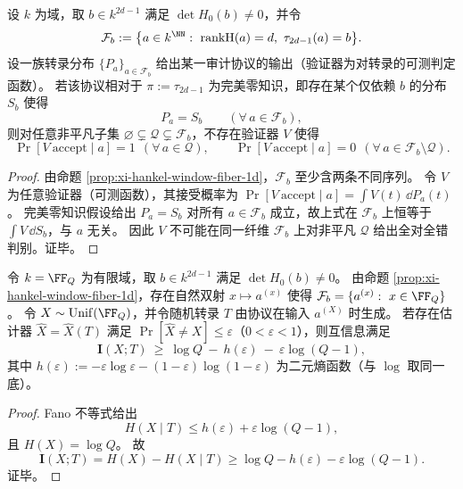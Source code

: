 \begin{theorem}\label{thm:xi-hankel-window-2dminus1-perfect-zk-indistinguishability}
设 \(k\) 为域，取 \(b\in k^{2d-1}\) 满足 \(\det H_0(b)\neq 0\)，并令
\[
\mathcal F_b:=\bigl\{a\in k^{\NN}:\ \mathrm{rankH}(a)=d,\ \tau_{2d-1}(a)=b\bigr\}.
\]
设一族转录分布 \(\{P_a\}_{a\in\mathcal F_b}\) 给出某一审计协议的输出（验证器为对转录的可测判定函数）。
若该协议相对于 \(\pi:=\tau_{2d-1}\) 为完美零知识，即存在某个仅依赖 \(b\) 的分布 \(S_b\) 使得
\[
P_a=S_b\qquad(\forall\,a\in\mathcal F_b),
\]
则对任意非平凡子集 \(\varnothing\subsetneq \mathcal Q\subsetneq \mathcal F_b\)，不存在验证器 \(V\) 使得
\[
\Pr[V\ \mathrm{accept}\mid a]=1\ \ (\forall\,a\in\mathcal Q),
\qquad
\Pr[V\ \mathrm{accept}\mid a]=0\ \ (\forall\,a\in\mathcal F_b\setminus\mathcal Q).
\]
\end{theorem}
\begin{proof}
由命题 \ref{prop:xi-hankel-window-fiber-1d}，\(\mathcal F_b\) 至少含两条不同序列。
令 \(V\) 为任意验证器（可测函数），其接受概率为
\(
\Pr[V\ \mathrm{accept}\mid a]=\int V(t)\,\dd P_a(t)
\)。
完美零知识假设给出 \(P_a=S_b\) 对所有 \(a\in\mathcal F_b\) 成立，故上式在 \(\mathcal F_b\) 上恒等于 \(\int V\,\dd S_b\)，与 \(a\) 无关。
因此 \(V\) 不可能在同一纤维 \(\mathcal F_b\) 上对非平凡 \(\mathcal Q\) 给出全对全错判别。证毕。
\end{proof}

\begin{theorem}[纤维内误差恢复所需的信息泄漏下界]\label{thm:xi-hankel-fiber-fano-information-leakage}
令 \(k=\FF_Q\) 为有限域，取 \(b\in k^{2d-1}\) 满足 \(\det H_0(b)\neq 0\)。
由命题 \ref{prop:xi-hankel-window-fiber-1d}，存在自然双射 \(x\mapsto a^{(x)}\) 使得
\(\mathcal F_b=\{a^{(x)}:\ x\in\FF_Q\}\)。
令 \(X\sim\mathrm{Unif}(\FF_Q)\)，并令随机转录 \(T\) 由协议在输入 \(a^{(X)}\) 时生成。
若存在估计器 \(\widehat X=\widehat X(T)\) 满足 \(\Pr[\widehat X\neq X]\le \varepsilon\)（\(0<\varepsilon<1\)），则互信息满足
\[
\mathbf I(X;T)\ \ge\ \log Q\ -\ h(\varepsilon)\ -\ \varepsilon\log(Q-1),
\]
其中 \(h(\varepsilon):=-\varepsilon\log\varepsilon-(1-\varepsilon)\log(1-\varepsilon)\) 为二元熵函数（与 \(\log\) 取同一底）。
\end{theorem}
\begin{proof}
Fano 不等式给出
\[
H(X\mid T)\le h(\varepsilon)+\varepsilon\log(Q-1),
\]
且 \(H(X)=\log Q\)。
故
\[
\mathbf I(X;T)=H(X)-H(X\mid T)\ge \log Q-h(\varepsilon)-\varepsilon\log(Q-1).
\]
证毕。
\end{proof}

